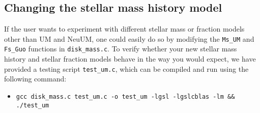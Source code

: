 \documentclass[12pt]{article}
\begin{document}
    \subsection{Changing the stellar mass history model}
    If the user wants to experiment with different stellar mass or fraction models other than UM and NeuUM, one could easily do so by modifying the \texttt{Ms\_UM} and \texttt{Fs\_Guo} functions in \texttt{disk\_mass.c}. To verify whether your new stellar mass history and stellar fraction models behave in the way you would expect, we have provided a testing script \texttt{test\_um.c}, which can be compiled and run using the following command:
    \begin{itemize}
        \item \texttt{gcc disk\_mass.c test\_um.c -o test\_um -lgsl -lgslcblas -lm \&\& ./test\_um}
    \end{itemize}
	
	
\end{document}
